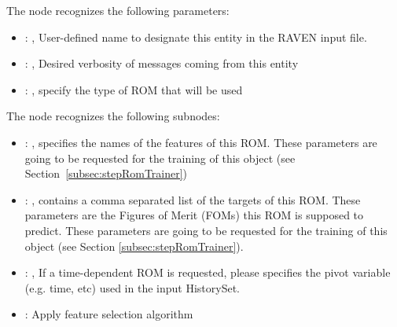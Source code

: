   The  node recognizes the following parameters:
    \begin{itemize}
      \item {}: ,
        User-defined name to designate this entity in the RAVEN input file.
      \item {}: ,
        Desired verbosity of messages coming from this entity
      \item {}: ,
        specify the type of ROM that will be used
  \end{itemize}

  The  node recognizes the following subnodes:
  \begin{itemize}
    \item {}: ,
      specifies the names of the features of this ROM.         \nb These parameters are going to be
      requested for the training of this object         (see Section~\ref{subsec:stepRomTrainer})

    \item {}: ,
      contains a comma separated list of the targets of this ROM. These parameters         are the
      Figures of Merit (FOMs) this ROM is supposed to predict.         \nb These parameters are
      going to be requested for the training of this         object (see Section
      \ref{subsec:stepRomTrainer}).

    \item {}: ,
      If a time-dependent ROM is requested, please specifies the pivot         variable (e.g. time,
      etc) used in the input HistorySet.

    \item {}:
      Apply feature selection algorithm


\end{itemize}
